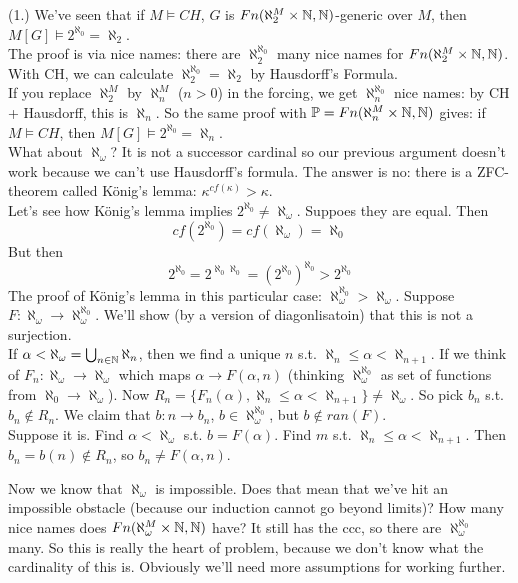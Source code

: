 \documentclass[a4paper]{article}
\begin{document}
(1.) We've seen that if $M \vDash CH$, $G$ is $Fn(\aleph_2^M \times \mathbb{N}, \mathbb{N})$-generic over $M$, then $M[G] \vDash 2^{\aleph_0} = \aleph_2$.\\
The proof is via nice names: there are $\aleph_2^{\aleph_0}$ many nice names for $Fn(\aleph_2^M \times \mathbb{N},\mathbb{N})$.\\
With CH, we can calculate $\aleph_2^{\aleph_0} = \aleph_2$ by Hausdorff's Formula.\\
If you replace $\aleph_2^M$ by $\aleph_n^M$ ($n>0$) in the forcing, we get $\aleph_n^{\aleph_0}$ nice names: by CH + Hausdorff, this is $\aleph_n$. So the same proof with $\mathbb{P}=Fn(\aleph_n^M \times \mathbb{N}, \mathbb{N})$ gives: if $M \vDash CH$, then $M[G] \vDash 2^{\aleph_0} = \aleph_n$.\\
What about $\aleph_\omega$? It is not a successor cardinal so our previous argument doesn't work because we can't use Hausdorff's formula. The answer is no: there is a ZFC-theorem called K\"{o}nig's lemma: $\kappa^{cf(\kappa)} > \kappa$.\\
Let's see how K\"{o}nig's lemma implies $2^{\aleph_0} \neq \aleph_\omega$. Suppoes they are equal. Then
\[
cf(2^{\aleph_0}) = cf(\aleph_\omega) = \aleph_0
\]
But then
\[
2^{\aleph_0} = 2^{\aleph_0 \aleph_0} = (2^{\aleph_0})^{\aleph_0} > 2^{\aleph_0}
\]
The proof of K\"{o}nig's lemma in this particular case: $\aleph_\omega^{\aleph_0} > \aleph_\omega$. Suppose $F:\aleph_\omega \to \aleph_\omega^{\aleph_0}$. We'll show (by a version of diagonlisatoin) that this is not a surjection.\\
If $\alpha < \aleph_\omega = \bigcup_{n \in \mathbb{N}} \aleph_n$, then we find a unique $n$ s.t. $\aleph_n \leq \alpha < \aleph_{n+1}$. If we think of $F_n:\aleph_\omega \to \aleph_\omega$ which maps $\alpha \to F(\alpha,n)$ (thinking $\aleph_\omega^{\aleph_0}$ as set of functions from $\aleph_0 \to \aleph_\omega$). Now $R_n = \{F_n(\alpha),\aleph_n \leq \alpha < \aleph_{n+1}\} \neq \aleph_\omega$. So pick $b_n$ s.t. $b_n \not\in R_n$. We claim that $b:n \to b_n$, $b \in \aleph_\omega^{\aleph_0}$, but $b \not\in ran(F)$.\\
Suppose it is. Find $\alpha < \aleph_\omega$ s.t. $b=F(\alpha)$. Find $m$ s.t. $\aleph_n \leq \alpha < \aleph_{n+1}$. Then $b_n = b(n) \not\in R_n$, so $b_n \neq F(\alpha,n)$.

Now we know that $\aleph_\omega$ is impossible. Does that mean that we've hit an impossible obstacle (because our induction cannot go beyond limits)? How many nice names does $Fn(\aleph_\omega^M \times \mathbb{N} ,\mathbb{N})$ have? It still has the ccc, so there are $\aleph_\omega^{\aleph_0}$ many. So this is really the heart of problem, because we don't know what the cardinality of this is. Obviously we'll need more assumptions for working further.
\end{document}

